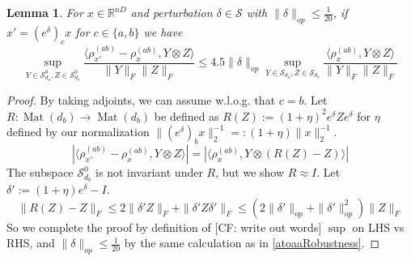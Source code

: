 \documentclass{article}
\newtheorem{lemma}[theorem]{Lemma}
\newcommand{\R}{{\mathbb{R}}}
\newcommand{\mat}{\operatorname{Mat}}
\newcommand\Sym{\mathcal{S}}
\newcommand\samp{x}
\newcommand{\CF}[1]{{\color{purple}[CF: #1]}}
\begin{document}
\begin{lemma} \label{btoabRobustness}
For $\samp \in \R^{nD}$ and perturbation $\delta \in \Sym$ with $\|\delta\|_{op} \leq \frac{1}{20}$, if $\samp' = (e^{\delta})_c \samp$ for $c \in \{a,b\}$ we have 
\[ \sup_{Y \in \Sym_{d_{a}}^{0}, Z \in \Sym_{d_{b}}^{0}} \frac{\langle \rho_{\samp'}^{(ab)} - \rho_{\samp}^{(ab)}, Y \otimes Z \rangle}{\|Y\|_{F} \|Z\|_{F}} \leq 4.5 \|\delta\|_{op} \sup_{Y \in \Sym_{d_{a}}, Z \in \Sym_{d_{b}}} \frac{\langle \rho_{\samp}^{(ab)}, Y \otimes Z \rangle}{\|Y\|_{F} \|Z\|_{F}}        \]
\end{lemma}
\begin{proof}
By taking adjoints, we can assume w.l.o.g. that $c = b$. Let $R : \mat(d_{b}) \to \mat(d_{b})$ be defined as $R(Z) := (1+\eta)^{2} e^{\delta} Z e^{\delta}$ for $\eta$ defined by our normalization $\|(e^{\delta})_{b} \samp\|_{2}^{-1} =: (1+\eta) \|\samp\|_{2}^{-1}$.
\[ |\langle \rho_{\samp'}^{(ab)} - \rho_{\samp}^{(ab)}, Y \otimes Z \rangle| = |\langle \rho_{\samp}^{(ab)}, Y \otimes (R(Z) - Z) \rangle|  \]
The subspace $\Sym_{d_{b}}^{0}$ is not invariant under $R$, but we show $R \approx I$. Let $\delta' := (1+\eta) e^{\delta} - I$. 
\[ \|R(Z) - Z\|_{F} \leq 2 \|\delta' Z\|_{F} + \|\delta' Z \delta'\|_{F} \leq (2 \|\delta'\|_{op} + \|\delta'\|_{op}^{2}) \|Z\|_{F}    \]
So we complete the proof by definition of \CF{write out words} $\sup$ on LHS vs RHS, and $\|\delta\|_{op} \leq \frac{1}{20}$ by the same calculation as in \ref{atoaaRobustness}. 
\end{proof}
\end{document}
